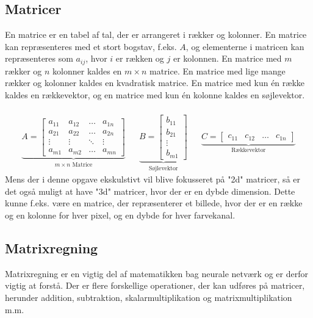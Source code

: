 \documentclass{article}
\begin{document}
\subsection{Matricer}
En matrice er en tabel af tal, der er arrangeret i rækker og kolonner. En matrice kan repræsenteres med et stort bogstav, f.eks. $A$, og elementerne i matricen kan repræsenteres som $a_{ij}$, hvor $i$ er rækken og $j$ er kolonnen. En matrice med $m$ rækker og $n$ kolonner kaldes en $m \times n$ matrice. En matrice med lige mange rækker og kolonner kaldes en kvadratisk matrice. En matrice med kun én række kaldes en rækkevektor, og en matrice med kun én kolonne kaldes en søjlevektor. \parencite{Lauritzen_2019}\\\\
\begin{align}
  \underbrace{A = \begin{bmatrix}
    a_{11} & a_{12} & \ldots & a_{1n} \\
    a_{21} & a_{22} & \ldots & a_{2n} \\
    \vdots & \vdots & \ddots & \vdots \\
    a_{m1} & a_{m2} & \ldots & a_{mn}
  \end{bmatrix}}_{\text{$m \times n$ Matrice}} 
  &&
  \underbrace{B = \begin{bmatrix}
    b_{11} \\
    b_{21} \\
    \vdots \\
    b_{m1}
  \end{bmatrix}}_{\text{Søjlevektor}} 
  &&
  \underbrace{C = \begin{bmatrix}
    c_{11} & c_{12} & \ldots & c_{1n}
  \end{bmatrix}}_{\text{Rækkevektor}} 
\end{align}
Mens der i denne opgave ekskulstivt vil blive fokusseret på "2d" matricer, så er det også muligt at have "3d" matricer, hvor der er en dybde dimension. Dette kunne f.eks. være en matrice, der repræsenterer et billede, hvor der er en række og en kolonne for hver pixel, og en dybde for hver farvekanal.
\subsection{Matrixregning}
Matrixregning er en vigtig del af matematikken bag neurale netværk og er derfor vigtig at forstå. Der er flere forskellige operationer, der kan udføres på matricer, herunder addition, subtraktion, skalarmultiplikation og matrixmultiplikation m.m.
\end{document}
